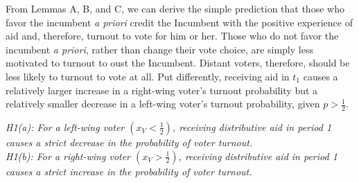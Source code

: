\documentclass[12pt]{paper}
\begin{document}
From Lemmas A, B, and C, we can derive the simple prediction that those who favor the incumbent \emph{a priori} credit the Incumbent with the positive experience of aid and, therefore, turnout to vote for him or her. Those who do not favor the incumbent \emph{a priori}, rather than change their vote choice, are simply less motivated to turnout to oust the Incumbent. Distant voters, therefore, should be less likely to turnout to vote at all. Put differently, receiving aid in $t_1$ causes a relatively larger increase in a right-wing voter’s turnout probability but a relatively smaller decrease in a left-wing voter’s turnout probability, given $p > \frac{1}{2}$. 

\emph{H1(a): For a left-wing voter $(x_V < \frac{1}{2})$, receiving distributive aid in period 1 causes a strict decrease in the probability of voter turnout.\\
H1(b): For a right-wing voter $(x_V > \frac{1}{2})$, receiving distributive aid in period 1 causes a strict increase in the probability of voter turnout.}

\end{document}
